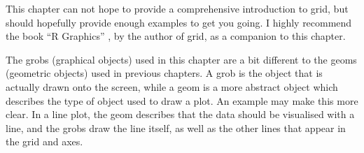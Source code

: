 This chapter can not hope to provide a comprehensive introduction to grid, but should hopefully provide enough examples to get you going.   I highly recommend the book ``R Graphics'' \citep{murrell:2005}, by the author of grid,  as a companion to this chapter.   

The grobs (graphical objects) used in this chapter are a bit different to the geoms (geometric objects) used in previous chapters.  A grob is the object that is actually drawn onto the screen, while a geom is a more abstract object which describes the type of object used to draw a plot.  An example may make this more clear. In a line plot, the geom describes that the data should be visualised with a line, and the grobs draw the line itself, as well as the other lines that appear in the grid and axes.

% 
% 
% 
% 
% 
% 
% 
% 
% 
% 
% 

